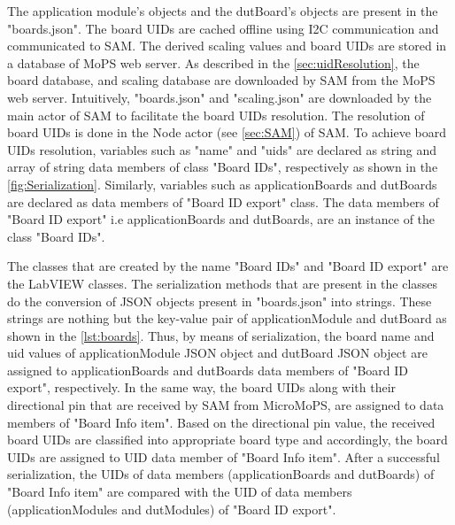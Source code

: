 The application module's objects and the dutBoard's objects are present in the "boards.json".
The board UIDs are cached offline using I2C communication and communicated to SAM.
The derived scaling values and board UIDs are stored in a database of \acrshort{MoPS} web server.
As described in the \cref{sec:uidResolution}, the board database, and scaling database are downloaded by SAM from the MoPS web server. 
Intuitively, "boards.json" and "scaling.json" are downloaded by the main actor of SAM to facilitate the board UIDs resolution. 
The resolution of board UIDs is done in the Node actor (see \cref{sec:SAM}) of SAM. 
To achieve board UIDs resolution, variables such as "name" and "uids" are declared as string and array of string data members of class "Board IDs", respectively as shown in the \cref{fig:Serialization}. 
Similarly, variables such as applicationBoards and dutBoards are declared as data members of "Board ID export" class.
The data members of "Board ID export" i.e applicationBoards and dutBoards, are an instance of the class "Board IDs".

The classes that are created by the name "Board IDs" and "Board ID export" are the LabVIEW classes.
The serialization methods that are present in the classes do the conversion of JSON objects present in "boards.json" into strings. 
These strings are nothing but the key-value pair of applicationModule and dutBoard as shown in the \cref{lst:boards}. 
Thus, by means of serialization, the board name and uid values of applicationModule JSON object and dutBoard JSON object are assigned to applicationBoards and dutBoards data members of "Board ID export", respectively.
In the same way, the board UIDs along with their directional pin that are received by SAM from MicroMoPS, are assigned to data members of "Board Info item".
Based on the directional pin value, the received board UIDs are classified into appropriate board type and accordingly, the board UIDs are assigned to UID data member of "Board Info item".
After a successful serialization, the UIDs of data members (applicationBoards and dutBoards) of "Board Info item" are compared with the UID of data members (applicationModules and dutModules) of "Board ID export".

